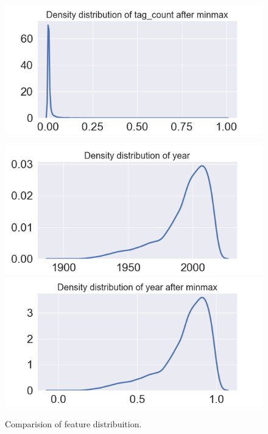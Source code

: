 \documentclass[../main]{subfiles}
\begin{document}
\begin{figure}[htb]
\begin{minipage}[t]{.19\linewidth}
        \includegraphics[width=\linewidth]{figures/minmax_tag_count.png}
    \end{minipage}  
    \begin{minipage}[t]{.19\linewidth}
        \centering
        \includegraphics[width=\linewidth]{figures/original_year.png}
        \includegraphics[width=\linewidth]{figures/minmax_year.png}
    \end{minipage}    
    \label{fig:distribuition_features}
    \caption{Comparision of feature distribuition.}
\end{figure}
\end{document}
